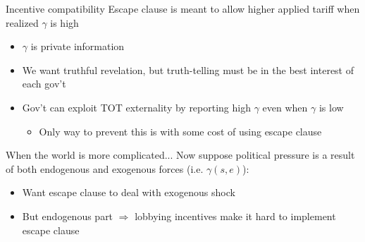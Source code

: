 \documentclass[handout]{beamer}
\newcommand{\ga}{\gamma}
\begin{document}
{\begin{frame}{Incentive compatibility}
\pause
Escape clause is meant to allow higher applied tariff when realized $\ga$ is high
\pause
\begin{itemize}[<+->]
	\item $\ga$ is private information
	\item We want truthful revelation, but truth-telling must be in the best interest of each gov't
	\item Gov't can exploit TOT externality by reporting high $\ga$ even when $\ga$ is low
		\begin{itemize}
			\item Only way to prevent this is with some cost of using escape clause
		\end{itemize}
	\end{itemize}
\end{frame}




\begin{frame}{When the world is more complicated...}
Now suppose political pressure is a result of both endogenous and exogenous forces (i.e. $\ga(s,e)$):
\pause
\begin{itemize}[<+->]
	\item Want escape clause to deal with exogenous shock
	\item But endogenous part $\Rightarrow$ lobbying incentives make it hard to implement escape clause
\end{itemize}


\end{frame}}
\end{document}
